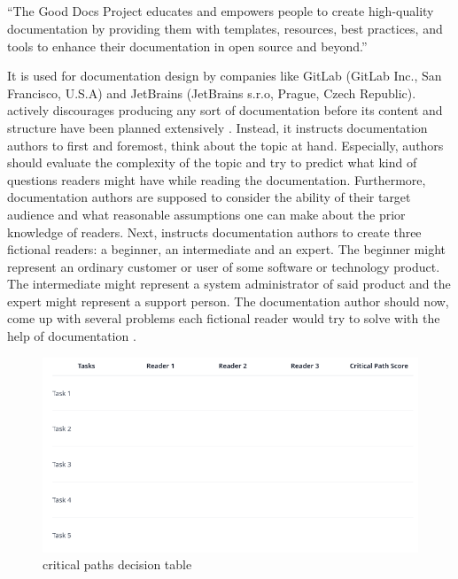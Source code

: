 \subsection{\good}\label{s:b-gooddocs}
\begin{displayquote}
	``The Good Docs Project educates and empowers people to create high-quality documentation by providing them with templates, resources, best practices, and tools to enhance their documentation in open source and beyond.'' \cite{shorterGoodDocsProject2024}
\end{displayquote}
It is used for documentation design by companies like GitLab (GitLab Inc., San Francisco, U.S.A) and JetBrains (JetBrains s.r.o, Prague, Czech Republic).
\good\space actively discourages producing any sort of documentation before its content and structure have been planned extensively \cite{shorterGoodDocsProject2024}.
Instead, it instructs documentation authors to first and foremost, think about the topic at hand.
Especially, authors should evaluate the complexity of the topic and try to predict what kind of questions readers might have while reading the documentation.
Furthermore, documentation authors are supposed to consider the ability of their target audience and what reasonable assumptions one can make about the prior knowledge of
readers.
Next, \good\space instructs documentation authors to create three fictional readers: a beginner, an intermediate and an expert.
The beginner might represent an ordinary customer or user of some software or technology product.
The intermediate might represent a system administrator of said product
and the expert might represent a support person.
The documentation author should now, come up with several problems each fictional reader would try to solve with the help of documentation \cite{shorterGoodDocsProject2024}.
\begin{figure}[h]
	\centerline{
		\includegraphics[scale=0.5]{images/gd_dt.png}}
	\caption{\good\space critical paths decision table \cite{shorterGoodDocsProject2024}}\label{fig:dg-dt}
\end{figure}

